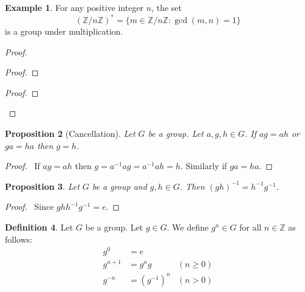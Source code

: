 \documentclass{book}
\let\qed\relax
\newtheorem{prop}{Proposition}[chapter]
\theoremstyle{definition}
\newtheorem{df}[prop]{Definition}
\newtheorem{ex}[prop]{Example}
\newcommand{\inv}[1]{\ensuremath{{#1}^{-1}}}
\begin{document}
\begin{ex}
    For any positive integer $n$, the set
    \[ (\mathbb{Z} / n \mathbb{Z})^* = \{ m \in \mathbb{Z} / n \mathbb{Z} : \gcd(m,n) = 1 \} \]
    is a group under multiplication.
\end{ex}

\begin{proof}
    \pf
    \begin{proof}
    \end{proof}
    \begin{proof}
    \end{proof}
    \qed
\end{proof}

\begin{prop}[Cancellation]
    Let $G$ be a group. Let $a,g,h \in G$. If $ag = ah$ or $ga = ha$ then $g = h$.
\end{prop}

\begin{proof}
    \pf\ If $ag = ah$ then $g = \inv{a} a g = \inv{a} a h = h$. Similarly if $ga = ha$. \qed
\end{proof}

\begin{prop}
    Let $G$ be a group and $g,h \in G$. Then $(gh)^{-1} = h^{-1}g^{-1}$.
\end{prop}

\begin{proof}
    \pf\ Since $ghh^{-1}g^{-1} = e$. \qed
\end{proof}

\begin{df}
    Let $G$ be a group. Let $g \in G$. We define $g^n \in G$ for all $n \in \mathbb{Z}$ as follows:
    \begin{align*}
        g^0 & = e \\
        g^{n+1} & = g^n g & (n \geq 0) \\
        g^{-n} & = (g^{-1})^n & (n > 0)
    \end{align*}
\end{df}
\end{document}
